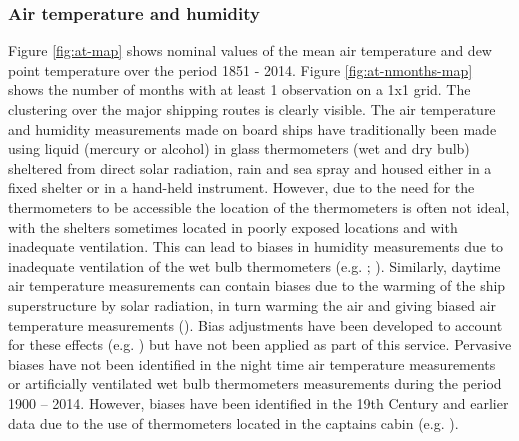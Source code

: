 \subsubsection{Air temperature and humidity}
Figure \ref{fig:at-map} shows nominal values of the mean air temperature and dew point temperature over the period 1851 - 2014. 
Figure \ref{fig:at-nmonths-map} shows the number of months with at least 1 observation on a 1x1 grid. 
The clustering over the major shipping routes is clearly visible.
The air temperature and humidity measurements made on board ships have traditionally been made using liquid (mercury or alcohol) in glass thermometers (wet and dry bulb) sheltered from direct solar radiation, rain and sea spray and housed either in a fixed shelter or in a hand-held instrument. 
However, due to the need for the thermometers to be accessible the location of the thermometers is often not ideal, with the shelters sometimes located in poorly exposed locations and with inadequate ventilation.
This can lead to biases in humidity measurements due to inadequate ventilation of the wet bulb thermometers (e.g. \cite{Berry2011}; \cite{Willett2008}). 
Similarly, daytime air temperature measurements can contain biases due to the warming of the ship superstructure by solar radiation, in turn warming the air and giving biased air temperature measurements (\cite{Rayner2003}). 
Bias adjustments have been developed to account for these effects (e.g. \cite{Berry2004}) but have not been applied as part of this service. 
Pervasive biases have not been identified in the night time air temperature measurements or artificially ventilated wet bulb thermometers measurements during the period 1900 – 2014.
However, biases have been identified in the 19th Century and earlier data due to the use of thermometers located in the captains cabin (e.g. \cite{Chenoweth2000}).

